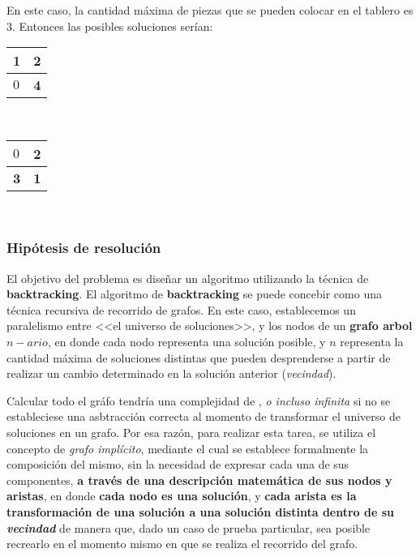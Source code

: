 \documentclass[11pt, a4paper, twoside]{article}
\begin{document}
\begin{ejemplo}
  En este caso, la cantidad máxima de piezas que se pueden colocar en el tablero es $3$. Entonces las posibles soluciones serían:
  
  \begin{center}
    \begin{minipage}{0.5\textwidth}
        \centering
        \begin{tabular}{ | l | l |}
            \hline 
            \textbf{1}  & \textbf{2} \\ 
            \hline 
            $0$  & \textbf{4} \\ 
            \hline
        \end{tabular}  \\
    \end{minipage}
    \begin{minipage}{0.5\textwidth}
        \begin{tabular}{ | l | l |}
            \hline 
            $0$     & \textbf{2} \\ 
            \hline 
            \textbf{3}  & \textbf{1} \\ 
            \hline
        \end{tabular} \\
    \end{minipage}
  \end{center}
\end{ejemplo}

\subsubsection{Hipótesis de resolución} 

El objetivo del problema es diseñar un algoritmo utilizando la técnica de
\textbf{backtracking}. El algoritmo de \textbf{backtracking} se puede concebir
como una técnica recursiva de recorrido de grafos. En este caso, establecemos un
paralelismo entre <<el universo de soluciones>>, y los nodos de un \textbf{grafo
arbol} $n-ario$, en donde cada nodo representa una solución posible, y $n$
representa la cantidad máxima de soluciones distintas que pueden desprenderse a
partir de realizar un cambio determinado en la solución anterior
(\emph{vecindad}).

Calcular todo el gráfo tendría una complejidad de , \emph{o incluso
infinita} si no se estableciese una asbtracción correcta al momento de
transformar el universo de soluciones en un grafo. Por esa razón, para realizar
esta tarea, se utiliza el concepto de \emph{grafo implícito}, mediante el cual
se establece formalmente la composición del mismo, sin la necesidad de expresar
cada una de sus componentes, \textbf{a través de una descripción matemática de
sus nodos y aristas}, en donde \textbf{cada nodo es una solución}, y
\textbf{cada arista es la transformación de una solución a una solución distinta
dentro de su \emph{vecindad}} de manera que, dado un caso de prueba particular,
sea posible recrearlo en el momento mismo en que se realiza el recorrido del
grafo.
\end{document}
